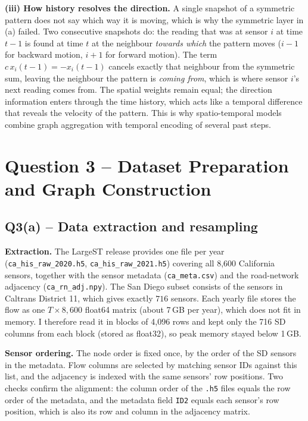 \documentclass[11pt, a4paper]{article}
\begin{document}
\textbf{(iii) How history resolves the direction.} A single snapshot of a symmetric pattern does not say which way it is moving, which is why the symmetric layer in (a) failed. Two consecutive snapshots do: the reading that was at sensor $i$ at time $t-1$ is found at time $t$ at the neighbour \emph{towards which} the pattern moves ($i - 1$ for backward motion, $i + 1$ for forward motion). The term $c\,x_i(t-1) = -x_i(t-1)$ cancels exactly that neighbour from the symmetric sum, leaving the neighbour the pattern is \emph{coming from}, which is where sensor $i$'s next reading comes from. The spatial weights remain equal; the direction information enters through the time history, which acts like a temporal difference that reveals the velocity of the pattern. This is why spatio-temporal models combine graph aggregation with temporal encoding of several past steps.

\section*{Question 3 -- Dataset Preparation and Graph Construction}

\subsection*{Q3(a) -- Data extraction and resampling}

\textbf{Extraction.} The LargeST release provides one file per year (\texttt{ca\_\allowbreak his\_\allowbreak raw\_\allowbreak 2020.h5}, \texttt{ca\_\allowbreak his\_\allowbreak raw\_\allowbreak 2021.h5}) covering all 8{,}600 California sensors, together with the sensor metadata (\texttt{ca\_\allowbreak meta.csv}) and the road-network adjacency (\texttt{ca\_\allowbreak rn\_\allowbreak adj.npy}). The San Diego subset consists of the sensors in Caltrans District 11, which gives exactly $716$ sensors. Each yearly file stores the flow as one $T \times 8{,}600$ float64 matrix (about 7\,GB per year), which does not fit in memory. I therefore read it in blocks of 4{,}096 rows and kept only the 716 SD columns from each block (stored as float32), so peak memory stayed below 1\,GB.

\textbf{Sensor ordering.} The node order is fixed once, by the order of the SD sensors in the metadata. Flow columns are selected by matching sensor IDs against this list, and the adjacency is indexed with the same sensors' row positions. Two checks confirm the alignment: the column order of the \texttt{.h5} files equals the row order of the metadata, and the metadata field \texttt{ID2} equals each sensor's row position, which is also its row and column in the adjacency matrix.
\end{document}
